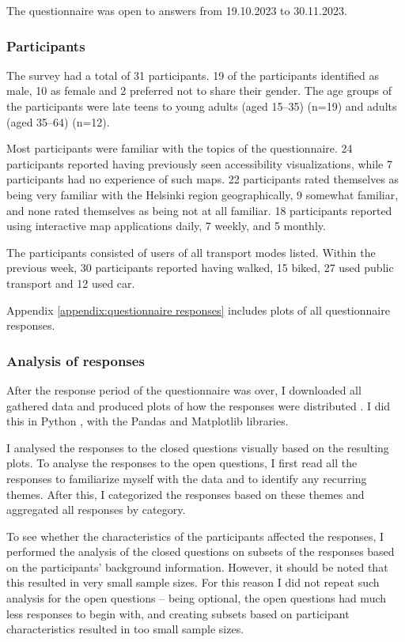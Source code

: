 The questionnaire was open to answers from 19.10.2023 to 30.11.2023.


\subsubsection{Participants}

The survey had a total of 31 participants.
19 of the participants identified as male,
10 as female and 2 preferred not to share their gender.
The age groups of the participants were late teens to young adults
(aged 15--35) (n=19) and adults (aged 35--64) (n=12).

Most participants were familiar with the topics of the questionnaire.
24 participants reported having previously seen accessibility visualizations,
while 7 participants had no experience of such maps.
22 participants rated themselves as being very familiar with the Helsinki region geographically,
9 somewhat familiar, and none rated themselves as being not at all familiar.
18 participants reported using interactive map applications daily,
7 weekly, and 5 monthly.

The participants consisted of users of all transport modes listed.
Within the previous week,
30 participants reported having walked, 15 biked, 27 used public transport
and 12 used car.

Appendix \ref{appendix:questionnaire responses}
includes plots of all questionnaire responses.


\subsubsection{Analysis of responses}

After the response period of the questionnaire was over,
I downloaded all gathered data and produced plots of how the responses were distributed
.
I did this in Python \parencite{python},
with the Pandas \parencite{pandas} and Matplotlib \parencite{hun2007}
libraries.

I analysed the responses to the closed questions visually based on the resulting plots.
To analyse the responses to the open questions,
I first read all the responses to familiarize myself with the data
and to identify any recurring themes.
After this, I categorized the responses based on these themes
and aggregated all responses by category.

To see whether the characteristics of the participants affected the responses,
I performed the analysis of the closed questions on subsets of the responses
based on the participants' background information.
However, it should be noted that this resulted in very small sample sizes.
For this reason I did not repeat such analysis for the open questions --
being optional, the open questions had much less responses to begin with,
and creating subsets based on participant characteristics resulted in too small sample sizes.
